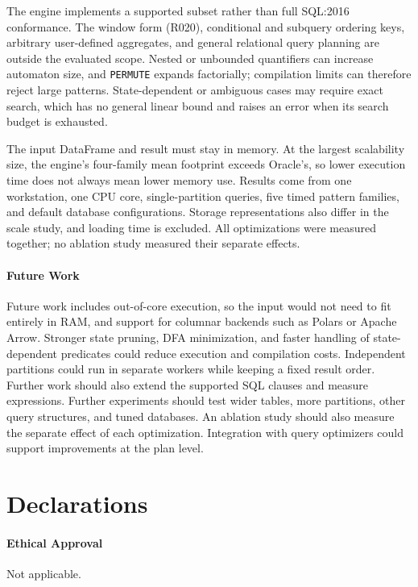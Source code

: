 \documentclass[preprint,12pt,times,a4paper]{elsarticle}
\begin{document}
The engine implements a supported subset rather than full SQL:2016
conformance. The window form (R020), conditional and subquery ordering keys,
arbitrary user-defined aggregates, and general relational query planning are
outside the evaluated scope. Nested or unbounded quantifiers can increase
automaton size, and \texttt{PERMUTE} expands factorially; compilation limits
can therefore reject large patterns. State-dependent or ambiguous cases may
require exact search, which has no general linear bound and raises an error
when its search budget is exhausted.

The input DataFrame and result must stay in memory. At the largest
scalability size, the engine's four-family mean footprint exceeds Oracle's,
so lower execution time does not always mean lower memory use. Results come
from one workstation, one CPU core, single-partition queries, five timed
pattern families, and default database configurations. Storage representations
also differ in the scale study, and loading time is excluded. All optimizations were measured together; no ablation study measured their
separate effects.

\paragraph{Future Work}

Future work includes out-of-core execution, so the input would not need to
fit entirely in RAM, and support for columnar backends such as Polars or
Apache Arrow. Stronger state pruning, DFA minimization, and faster handling
of state-dependent predicates could reduce execution and compilation costs.
Independent partitions could run in separate workers while keeping a fixed
result order. Further work should also extend the supported SQL clauses and
measure expressions. Further experiments should test wider tables, more partitions,
other query structures, and tuned databases. An ablation study should also
measure the separate effect of each optimization. Integration with query
optimizers could support improvements at the plan level.

\section*{Declarations}

\paragraph{Ethical Approval} Not applicable.
\end{document}
